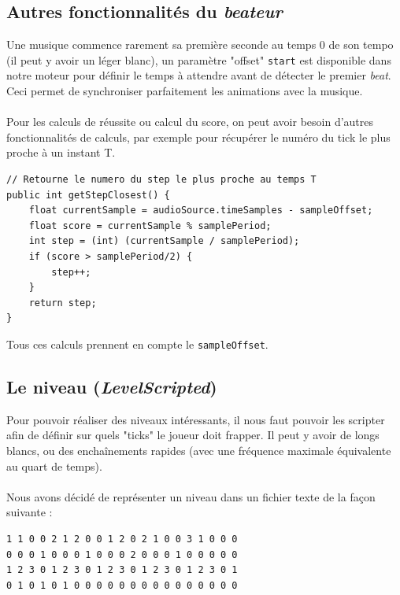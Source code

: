 \subsection{Autres fonctionnalités du \textit{beateur}}
Une musique commence rarement sa première seconde au temps 0 de son tempo (il peut y avoir un léger blanc), un paramètre "offset" \texttt{start} est disponible dans notre moteur pour définir le temps à attendre avant de détecter le premier \textit{beat}. Ceci permet de synchroniser parfaitement les animations avec la musique.
\\\\
Pour les calculs de réussite ou calcul du score, on peut avoir besoin d'autres fonctionnalités de calculs, par exemple pour récupérer le numéro du tick le plus proche à un instant T.
\\
\begin{lstlisting}
// Retourne le numero du step le plus proche au temps T
public int getStepClosest() {
    float currentSample = audioSource.timeSamples - sampleOffset;
    float score = currentSample % samplePeriod;
    int step = (int) (currentSample / samplePeriod);
    if (score > samplePeriod/2) {
        step++;
    }
    return step;
}
\end{lstlisting}
Tous ces calculs prennent en compte le \texttt{sampleOffset}.

\subsection{Le niveau (\textit{LevelScripted})}
\label{niveau}
Pour pouvoir réaliser des niveaux intéressants, il nous faut pouvoir les scripter afin de définir sur quels "ticks" le joueur doit frapper. Il peut y avoir de longs blancs, ou des enchaînements rapides (avec une fréquence maximale équivalente au quart de temps).
\\\\
Nous avons décidé de représenter un niveau dans un fichier texte de la façon suivante :\\
\begin{lstlisting}
1 1 0 0 2 1 2 0 0 1 2 0 2 1 0 0 3 1 0 0 0
0 0 0 1 0 0 0 1 0 0 0 2 0 0 0 1 0 0 0 0 0
1 2 3 0 1 2 3 0 1 2 3 0 1 2 3 0 1 2 3 0 1
0 1 0 1 0 1 0 0 0 0 0 0 0 0 0 0 0 0 0 0 0
\end{lstlisting}
\paragraph{}

